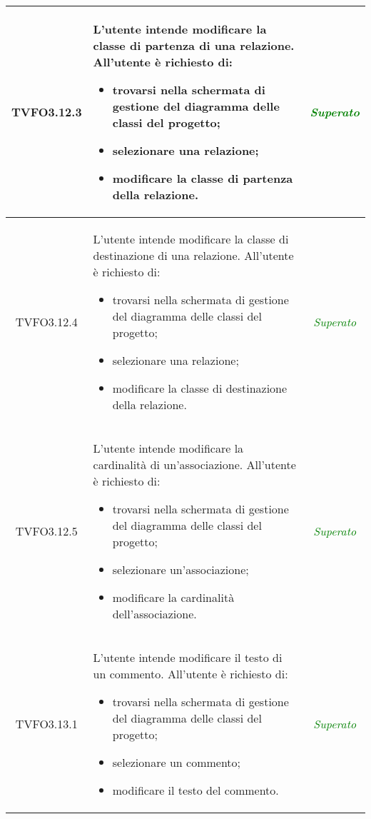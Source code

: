 \begin{longtable}{|c|>{}m{8cm}|c|}
\hypertarget{TVFO3.12.3}{TVFO3.12.3} & L'utente intende modificare la classe di partenza di una relazione.
All'utente è richiesto di:
\begin{itemize}
	\item trovarsi nella schermata di gestione del diagramma delle classi del progetto;
	\item selezionare una relazione;
	\item modificare la classe di partenza della relazione.
\end{itemize} & \textcolor{Green}{\textit{Superato}}\\ \hline

\hypertarget{TVFO3.12.4}{TVFO3.12.4} & L'utente intende modificare la classe di destinazione di una relazione.
All'utente è richiesto di:
\begin{itemize}
	\item trovarsi nella schermata di gestione del diagramma delle classi del progetto;
	\item selezionare una relazione;
	\item modificare la classe di destinazione della relazione.
\end{itemize} & \textcolor{Green}{\textit{Superato}}\\ \hline

\hypertarget{TVFO3.12.5}{TVFO3.12.5} & L'utente intende modificare la cardinalità di un'associazione.
All'utente è richiesto di:
\begin{itemize}
	\item trovarsi nella schermata di gestione del diagramma delle classi del progetto;
	\item selezionare un'associazione;
	\item modificare la cardinalità dell'associazione.
\end{itemize} & \textcolor{Green}{\textit{Superato}}\\ \hline

\hypertarget{TVFO3.13.1}{TVFO3.13.1} & L'utente intende modificare il testo di un commento. 
All'utente è richiesto di: 
\begin{itemize}
	\item trovarsi nella schermata di gestione del diagramma delle classi del progetto;
	\item selezionare un commento;
	\item modificare il testo del commento.
\end{itemize} & \textcolor{Green}{\textit{Superato}}\\ \hline


\end{longtable}
